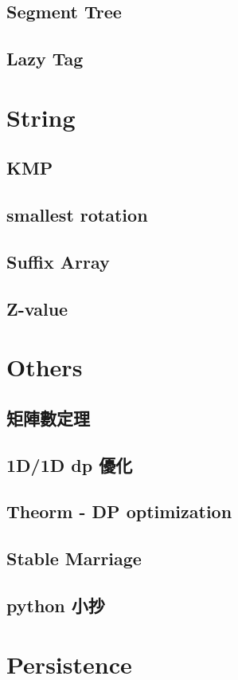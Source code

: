 \subsection{Segment Tree}

\subsection{Lazy Tag}




\section{String}

\subsection{KMP}

\subsection{smallest rotation}

\subsection{Suffix Array}

\subsection{Z-value}


\section{Others}

\subsection{矩陣數定理}

\subsection{1D/1D dp 優化}

\subsection{Theorm - DP optimization}

\subsection{Stable Marriage}

\subsection{python 小抄}



\section{Persistence}

